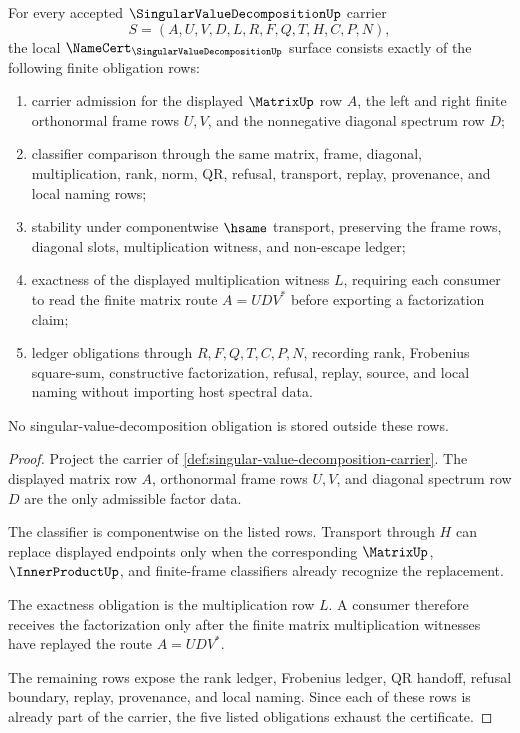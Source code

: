 
\begin{theorem}
\label{thm:singular-value-decomposition-namecert-obligations}
For every accepted $\SingularValueDecompositionUp$ carrier
$$
S=(A,U,V,D,L,R,F,Q,T,H,C,P,N),
$$
the local $\NameCert_{\SingularValueDecompositionUp}$ surface consists exactly of the following finite obligation rows:
\begin{enumerate}
\item carrier admission for the displayed $\MatrixUp$ row $A$, the left and right finite orthonormal frame rows $U,V$, and the nonnegative diagonal spectrum row $D$;
\item classifier comparison through the same matrix, frame, diagonal, multiplication, rank, norm, QR, refusal, transport, replay, provenance, and local naming rows;
\item stability under componentwise $\hsame$ transport, preserving the frame rows, diagonal slots, multiplication witness, and non-escape ledger;
\item exactness of the displayed multiplication witness $L$, requiring each consumer to read the finite matrix route $A=UDV^{\ast}$ before exporting a factorization claim;
\item ledger obligations through $R,F,Q,T,C,P,N$, recording rank, Frobenius square-sum, constructive factorization, refusal, replay, source, and local naming without importing host spectral data.
\end{enumerate}
No singular-value-decomposition obligation is stored outside these rows.
\end{theorem}
\begin{proof}
Project the carrier of \autoref{def:singular-value-decomposition-carrier}. The displayed matrix row $A$, orthonormal frame rows $U,V$, and diagonal spectrum row $D$ are the only admissible factor data.

The classifier is componentwise on the listed rows. Transport through $H$ can replace displayed endpoints only when the corresponding $\MatrixUp$, $\InnerProductUp$, and finite-frame classifiers already recognize the replacement.

The exactness obligation is the multiplication row $L$. A consumer therefore receives the factorization only after the finite matrix multiplication witnesses have replayed the route $A=UDV^{\ast}$.

The remaining rows expose the rank ledger, Frobenius ledger, QR handoff, refusal boundary, replay, provenance, and local naming. Since each of these rows is already part of the carrier, the five listed obligations exhaust the certificate.
\end{proof}


